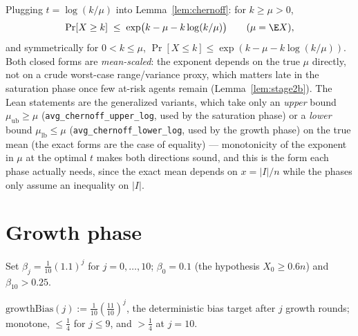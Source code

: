 \begin{lemma}\label{lem:chernofflog}
  \leanok
  Plugging $t=\log(k/\mu)$ into Lemma~\ref{lem:chernoff}: for $k\ge\mu>0$,
  \[
    \Pr[X\ge k] \;\le\; \exp\bigl(k-\mu-k\log(k/\mu)\bigr)
    \qquad(\mu=\E X),
  \]
  and symmetrically for $0<k\le\mu$,
  $\Pr[X\le k] \le \exp(k-\mu-k\log(k/\mu))$.
  Both closed forms are \emph{mean-scaled}: the exponent depends on the true
  $\mu$ directly, not on a crude worst-case range/variance proxy, which
  matters late in the saturation phase once few at-risk agents remain
  (Lemma~\ref{lem:stage2b}). The Lean statements are the generalized
  variants, which take only an \emph{upper} bound $\mu_{\mathrm{ub}}\ge\mu$
  (\texttt{avg\_chernoff\_upper\_log}, used by the saturation phase) or a
  \emph{lower} bound $\mu_{\mathrm{lb}}\le\mu$ (\texttt{avg\_chernoff\_lower\_log}, used by
  the growth phase) on the true mean (the exact forms are the case of equality) --- monotonicity of the exponent in $\mu$ at the optimal $t$
  makes both directions sound, and this is the form each phase actually
  needs, since the exact mean depends on $x=|I|/n$ while the phases only
  assume an inequality on $|I|$.
\end{lemma}

\section{Growth phase}\label{sec:growth}

Set $\beta_j = \tfrac1{10}(1.1)^j$ for $j=0,\dots,10$; $\beta_0=0.1$ (the
hypothesis $X_0\ge0.6n$) and $\beta_{10}>0.25$.

\begin{definition}\label{def:growthbias}
  \leanok
  $\mathrm{growthBias}(j) := \tfrac1{10}(\tfrac{11}{10})^j$, the deterministic
  bias target after $j$ growth rounds; monotone, $\le\tfrac14$ for $j\le9$,
  and $>\tfrac14$ at $j=10$.
\end{definition}

